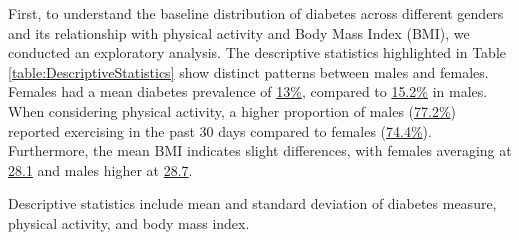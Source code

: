 \documentclass[11pt]{article}
\begin{document}
First, to understand the baseline distribution of diabetes across different genders and its relationship with physical activity and Body Mass Index (BMI), we conducted an exploratory analysis. The descriptive statistics highlighted in Table \ref{table:DescriptiveStatistics} show distinct patterns between males and females. Females had a mean diabetes prevalence of \hyperlink{A0a}{13\%}, compared to \hyperlink{A0b}{15.2\%} in males. When considering physical activity, a higher proportion of males (\hyperlink{A2b}{77.2\%}) reported exercising in the past 30 days compared to females (\hyperlink{A2a}{74.4\%}). Furthermore, the mean BMI indicates slight differences, with females averaging at \hyperlink{A4a}{28.1} and males higher at \hyperlink{A4b}{28.7}.

\begin{table}[h]
\caption{\protect\hyperlink{file-table-0-pkl}{Descriptive Statistics of Main Binary Variables and Body Mass Index Stratified by Gender}}
\label{table:DescriptiveStatistics}
\begin{threeparttable}
\renewcommand{\TPTminimum}{\linewidth}
\begin{tablenotes}
\footnotesize
\item Descriptive statistics include mean and standard deviation of diabetes measure, physical activity, and body mass index.
\end{tablenotes}
\end{threeparttable}
\end{table}
\end{document}

